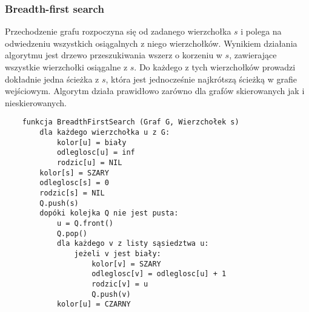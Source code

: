 \subsubsection{Breadth-first search}

Przechodzenie grafu rozpoczyna się od zadanego wierzchołka $s$ i polega na odwiedzeniu wszystkich osiągalnych z niego wierzchołków.
Wynikiem działania algorytmu jest drzewo przeszukiwania wszerz o korzeniu w $s$, zawierające wszystkie wierzchołki osiągalne z $s$.
Do każdego z tych wierzchołków prowadzi dokładnie jedna ścieżka z $s$, która jest jednocześnie najkrótszą ścieżką w grafie wejściowym.
Algorytm działa prawidłowo zarówno dla grafów skierowanych jak i nieskierowanych.

\begin{samepage}
    \begin{verbatim}
    funkcja BreadthFirstSearch (Graf G, Wierzchołek s)
        dla każdego wierzchołka u z G:
            kolor[u] = biały
            odleglosc[u] = inf
            rodzic[u] = NIL
        kolor[s] = SZARY
        odleglosc[s] = 0
        rodzic[s] = NIL
        Q.push(s)
        dopóki kolejka Q nie jest pusta:
            u = Q.front()
            Q.pop()
            dla każdego v z listy sąsiedztwa u:
                jeżeli v jest biały:
                    kolor[v] = SZARY
                    odleglosc[v] = odleglosc[u] + 1
                    rodzic[v] = u
                    Q.push(v)
            kolor[u] = CZARNY
    \end{verbatim}
\end{samepage}
